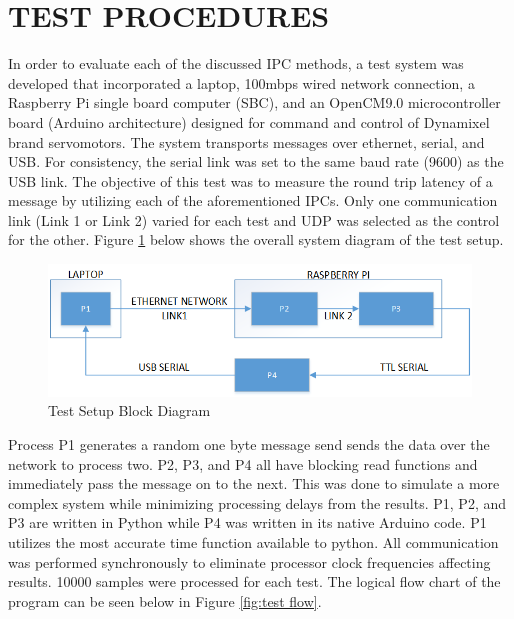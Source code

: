 \section{TEST PROCEDURES}

In order to evaluate each of the discussed IPC methods, a test system was developed that incorporated a laptop, 100mbps wired network connection, a Raspberry Pi single board computer (SBC), and an OpenCM9.0 microcontroller board (Arduino architecture) designed for command and control of Dynamixel brand servomotors. The system transports messages over ethernet, serial, and USB. For consistency, the serial link was set to the same baud rate (9600) as the USB link. The objective of this test was to measure the round trip latency of a message by utilizing each of the aforementioned IPCs. Only one communication link (Link 1 or Link 2) varied for each test and UDP was selected as the control for the other. Figure \ref{fig:test block diag} below shows the overall system diagram of the test setup. 

\begin{figure}[thpb]
 \centering
 \includegraphics[width=1.0\columnwidth]{./images/testblock.png}
  \caption{Test Setup Block Diagram}
  \label{fig:test block diag}
\end{figure} 

Process P1 generates a random one byte message send sends the data over the network to process two. P2, P3, and P4 all have blocking read functions and immediately pass the message on to the next. This was done to simulate a more complex system while minimizing processing delays from the results. P1, P2, and P3 are written in Python while P4 was written in its native Arduino code. P1 utilizes the most accurate time function available to python. All communication was performed synchronously to eliminate processor clock frequencies affecting results. 10000 samples were processed for each test. The logical flow chart of the program can be seen below in Figure \ref{fig:test flow}.

